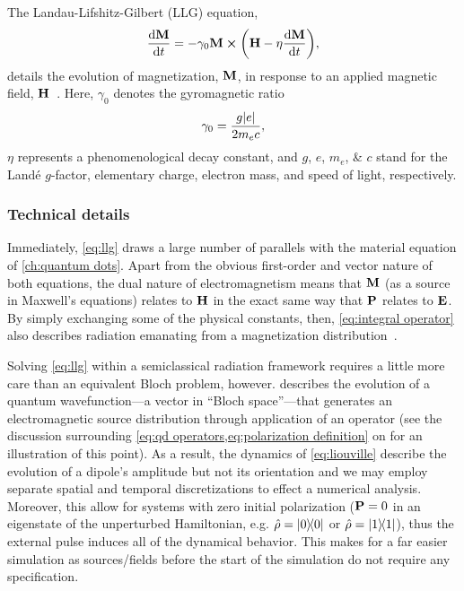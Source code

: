 The Landau-Lifshitz-Gilbert (LLG) equation,
\begin{equation}
  \dv{\vb{M}}{t} = -\gamma_0 \vb{M} \cp \qty(\vb{H} - \eta \dv{\vb{M}}{t}),
  \label{eq:llg}
\end{equation}
details the evolution of magnetization, $\vb{M}$, in response to an applied magnetic field, $\vb{H}$~\cite{Aharoni2000}.
Here, $\gamma_0$ denotes the gyromagnetic ratio
\begin{equation}
  \gamma_0 = \frac{g \abs{e}}{2 m_e c},
  \label{eq:gyro}
\end{equation}
$\eta$ represents a phenomenological decay constant, and $g$, $e$, $m_e$, \& $c$ stand for the Land\'e $g$-factor, elementary charge, electron mass, and speed of light, respectively.

\subsubsection{Technical details}

Immediately, \cref{eq:llg} draws a large number of parallels with the material equation of  \cref{ch:quantum dots}.
Apart from the obvious first-order and vector nature of both equations, the dual nature of electromagnetism means that $\vb{M}$ (as a source in Maxwell's equations) relates to $\vb{H}$ in the exact same way that $\vb{P}$ relates to $\vb{E}$.
By simply exchanging some of the physical constants, then, \cref{eq:integral operator} also describes radiation emanating from a magnetization distribution~\cite{Rothwell2009}.

Solving \cref{eq:llg} within a semiclassical radiation framework requires a little more care than an equivalent Bloch problem, however.
 describes the evolution of a quantum wavefunction---a vector in ``Bloch space''---that generates an electromagnetic source distribution through application of an operator (see the discussion surrounding \cref{eq:qd operators,eq:polarization definition} on  for an illustration of this point).
As a result, the dynamics of \cref{eq:liouville} describe the evolution of a dipole's amplitude but not its orientation and we may employ separate spatial and temporal discretizations to effect a numerical analysis.
Moreover, this allow for systems with zero initial polarization ($\vb{P} = 0$ in an eigenstate of the unperturbed Hamiltonian, e.g. $\hat{\rho} = \op{0}{0}$ or $\hat{\rho} = \op{1}{1}$), thus the external pulse induces all of the dynamical behavior.
This makes for a far easier simulation as sources/fields before the start of the simulation do not require any specification.

